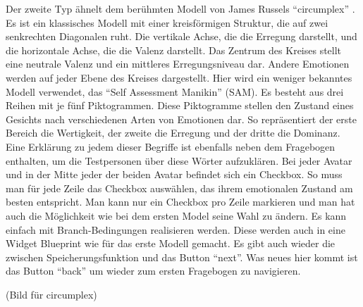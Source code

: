 Der zweite Typ {\"a}hnelt dem ber{\"u}hmten Modell von James Russels ``circumplex'' \cite{russel_1980}. Es ist ein klassisches Modell mit einer kreisf{\"o}rmigen Struktur, die auf zwei senkrechten Diagonalen ruht. Die vertikale Achse, die die Erregung darstellt, und die horizontale Achse, die die Valenz darstellt. Das Zentrum des Kreises stellt eine neutrale Valenz und ein mittleres Erregungsniveau dar. Andere Emotionen werden auf jeder Ebene des Kreises dargestellt.  Hier wird ein weniger bekanntes Modell verwendet, das ``Self Assessment Manikin'' (SAM). Es besteht aus drei Reihen mit je f{\"u}nf Piktogrammen. Diese Piktogramme stellen den Zustand eines Gesichts nach verschiedenen Arten von Emotionen dar. So repr{\"a}sentiert der erste Bereich die Wertigkeit, der zweite die Erregung und der dritte die Dominanz. Eine Erkl{\"a}rung zu jedem dieser Begriffe ist ebenfalls neben dem Fragebogen enthalten, um die Testpersonen {\"u}ber diese W{\"o}rter aufzukl{\"a}ren.  Bei jeder Avatar und in der Mitte jeder der beiden Avatar befindet sich ein Checkbox.  So muss man f{\"u}r jede Zeile das Checkbox ausw{\"a}hlen, das ihrem emotionalen Zustand am besten entspricht. Man kann nur ein Checkbox pro Zeile markieren und man hat auch die M{\"o}glichkeit wie bei dem ersten Model seine Wahl zu {\"a}ndern. Es kann einfach mit Branch-Bedingungen realisieren werden.  Diese werden auch in eine Widget Blueprint wie f{\"u}r das erste Modell gemacht. Es gibt auch wieder die zwischen Speicherungsfunktion und das Button ``next''. Was neues hier kommt ist das Button ``back'' um wieder zum ersten Fragebogen zu navigieren. 

(Bild f{\"u}r circumplex) \\